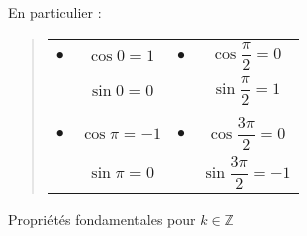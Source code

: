 \renewcommand{\arraystretch }{1.75}
En particulier : 
\begin{quote}
{
\begin{tabular}{l@{$\;$}c@{$\qquad$}l@{$\;$}c}
$\bullet$  & $\cos 0 = 1 $ 
         & $\bullet$ & $\cos \dfrac{\pi}{2} = 0 $ \\  
          & $\sin 0 = 0 $ 
         &  & $\sin \dfrac{\pi}{2} = 1 $ \\  
& & & \\
$\bullet$  & $\cos \pi = -1 $ 
         & $\bullet$ & $\cos \dfrac{3\pi}{2} = 0 $ \\  
  & $\sin \pi = 0 $ 
         & & $\sin \dfrac{3\pi}{2} = -1 $ \\                             
\end{tabular}              
}
\end{quote}
\renewcommand{\arraystretch }{1}
\newpage 

Propriétés fondamentales pour $k \in \mathbb{Z}$  

